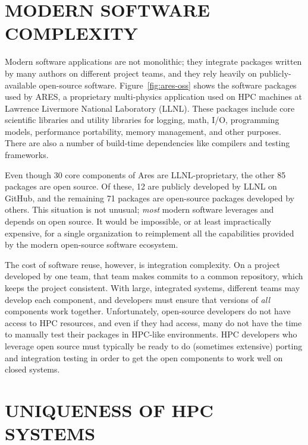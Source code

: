 \documentclass{IEEEcsmag}
\begin{document}
\section{MODERN SOFTWARE COMPLEXITY}

Modern software applications are not monolithic; they integrate packages written by many
authors on different project teams, and they rely heavily on publicly-available open-source software. Figure~\ref{fig:ares-oss} shows the software packages used by ARES, a
proprietary multi-physics application used on HPC machines at Lawrence Livermore
National Laboratory (LLNL). These packages include core scientific libraries and
utility libraries for logging, math, I/O, programming models, performance portability,
memory management, and other purposes. There are also a number of build-time
dependencies like compilers and testing frameworks.

Even though 30 core components of Ares are LLNL-proprietary, the other 85 packages are
open source. Of these, 12 are publicly developed by LLNL on GitHub, and the remaining 71
packages are open-source packages developed by others. This situation is not unusual;
{\it most} modern software leverages and depends on open source. It would be impossible, or at
least impractically expensive, for a single organization to reimplement all the capabilities
provided by the modern open-source software ecosystem.

The cost of software reuse, however, is integration complexity. On a project developed
by one team, that team makes commits to a common repository, which keeps the project consistent.
With large, integrated systems, different teams may develop each component, and
developers must ensure that versions of {\it all} components work together.
Unfortunately, open-source developers do not have access to HPC resources, and even
if they had access, many do not have the time to manually test their packages
in HPC-like environments. HPC developers who leverage open source must typically be ready to do
(sometimes extensive) porting and integration testing in order to get the open
components to work well on closed systems.

\section{UNIQUENESS OF HPC SYSTEMS}
\end{document}
